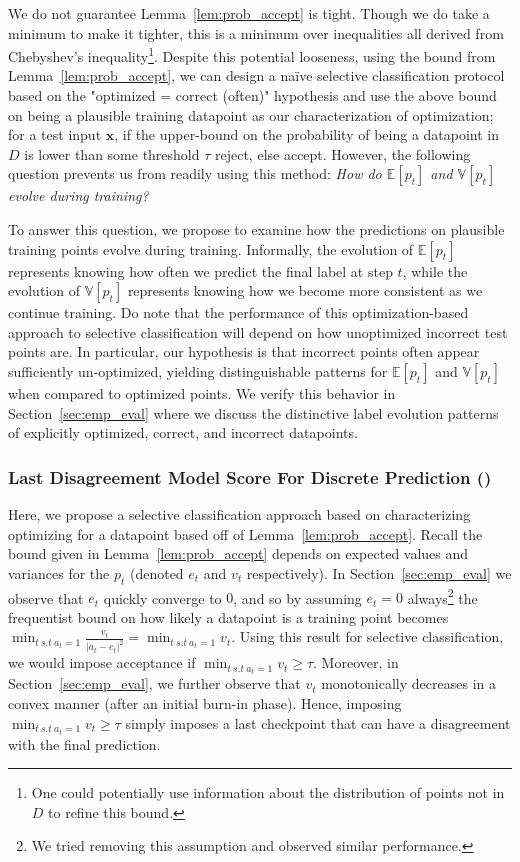 We do not guarantee Lemma~\ref{lem:prob_accept} is tight. Though we do take a minimum to make it tighter, this is a minimum over inequalities all derived from Chebyshev's inequality\footnote{One could potentially use information about the distribution of points not in $D$ to refine this bound.}. Despite this potential looseness, using the bound from Lemma~\ref{lem:prob_accept}, we can design a na\"ive selective classification protocol based on the "optimized = correct (often)" hypothesis and use the above bound on being a plausible training datapoint as our characterization of optimization; for a test input $\bm{x}$, if the upper-bound on the probability of being a datapoint in $D$ is lower than some threshold $\tau$ reject, else accept. However, the following question prevents us from readily using this method: \emph{How do $\mathbb{E}[p_{t}]$ and $\mathbb{V}[p_{t}]$ evolve during training?}

To answer this question, we propose to examine how the predictions on plausible training points evolve during training. Informally, the evolution of $\mathbb{E}[p_{t}]$ represents knowing how often we predict the final label at step $t$, while the evolution of $\mathbb{V}[p_{t}]$ represents knowing how we become more consistent as we continue training. Do note that the performance of this optimization-based approach to selective classification will depend on how unoptimized incorrect test points are. In particular, our hypothesis is that incorrect points often appear sufficiently un-optimized, yielding distinguishable patterns for $\mathbb{E}[p_{t}]$ and $\mathbb{V}[p_{t}]$ when compared to optimized points. We verify this behavior in Section~\ref{sec:emp_eval} where we discuss the distinctive label evolution patterns of explicitly optimized, correct, and incorrect datapoints.

\subsubsection{Last Disagreement Model Score For Discrete Prediction (\smax)}
\label{ssec:min_score}

Here, we propose a selective classification approach based on characterizing optimizing for a datapoint based off of Lemma~\ref{lem:prob_accept}. Recall the bound given in Lemma~\ref{lem:prob_accept} depends on expected values and variances for the $p_t$ (denoted $e_t$ and $v_t$ respectively). In Section~\ref{sec:emp_eval} we observe that $e_t$ quickly converge to $0$, and so by assuming $e_t = 0$ always\footnote{We tried removing this assumption and observed similar performance.} the frequentist bound on how likely a datapoint is a training point becomes $\min_{t~s.t~a_t = 1} \frac{v_t}{|a_t - e_t|^2}= \min_{t~s.t~a_t = 1}v_t$. Using this result for selective classification, we would impose acceptance if $\min_{t~s.t~a_t = 1}v_t \geq \tau$. Moreover, in Section~\ref{sec:emp_eval}, we further observe that $v_t$ monotonically decreases in a convex manner (after an initial burn-in phase). Hence, imposing $\min_{t~s.t~a_t = 1}v_t \geq \tau$ simply imposes a last checkpoint that can have a disagreement with the final prediction.

